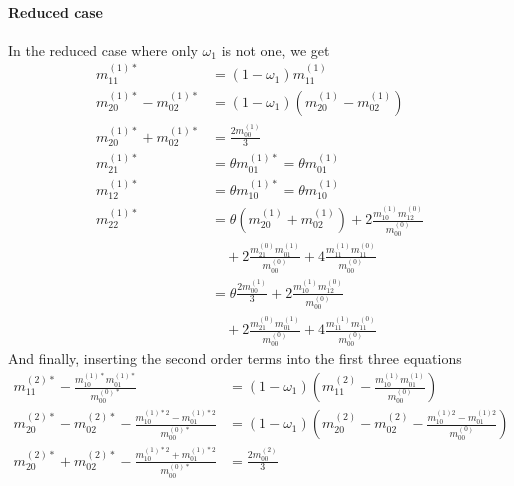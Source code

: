 \paragraph{Reduced case}
\label{par:Reduced case}
In the reduced case where only $\omega_1$ is not one, we get
\begin{equation}
  \begin{aligned}
    m_{11}^{(1)*} & = (1-\omega_1) m_{11}^{(1)} \\
    m_{20}^{(1)*} - m_{02}^{(1)*}
      & = (1-\omega_1) (m_{20}^{(1)} - m_{02}^{(1)}) \\
    m_{20}^{(1)*} + m_{02}^{(1)*}
      & =  \frac{2 m_{00}^{(1)}}{3} \\
    m_{21}^{(1)*} & = \theta m_{01}^{(1)*} = \theta m_{01}^{(1)} \\
    m_{12}^{(1)*} & = \theta m_{10}^{(1)*} = \theta m_{10}^{(1)} \\
    m_{22}^{(1)*} & =  \theta (m_{20}^{(1)} + m_{02}^{(1)})
      + 2\frac{ m_{10}^{(1)} m_{12}^{(0)} }{m_{00}^{(0)}}
      \\&\quad
      + 2\frac{ m_{21}^{(0)} m_{01}^{(1)} }{m_{00}^{(0)}}
      + 4\frac{ m_{11}^{(1)} m_{11}^{(0)} }{m_{00}^{(0)}}
      \\&= \theta \frac{2 m_{00}^{(1)}}{3} + 2\frac{ m_{10}^{(1)} m_{12}^{(0)} }{m_{00}^{(0)}}
      \\&\quad
      + 2\frac{ m_{21}^{(0)} m_{01}^{(1)} }{m_{00}^{(0)}}
      + 4\frac{ m_{11}^{(1)} m_{11}^{(0)} }{m_{00}^{(0)}}
  \end{aligned}
\end{equation}
And finally, inserting the second order terms into the first three equations
\begin{equation}
  \begin{aligned}
    m_{11}^{(2)*} - \frac{ m_{10}^{(1)*}m_{01}^{(1)*}}{m_{00}^{(0)*}} & = (1-\omega_1)\left(m_{11}^{(2)} - \frac{ m_{10}^{(1)}m_{01}^{(1)}}{m_{00}^{(0)}}\right) \\
    m_{20}^{(2)*}-m_{02}^{(2)*} - \frac{ m_{10}^{(1)*2} - m_{01}^{(1)*2}}{m_{00}^{(0)*}} & = (1-\omega_1) \left(m_{20}^{(2)}-m_{02}^{(2)} - \frac{ m_{10}^{(1)2} - m_{01}^{(1)2}}{m_{00}^{(0)}}\right) \\
    m_{20}^{(2)*}+m_{02}^{(2)*} - \frac{ m_{10}^{(1)*2} + m_{01}^{(1)*2}}{m_{00}^{(0)*}} & = \frac{2 m_{00}^{(2)}}{3}
  \end{aligned}
\end{equation}

